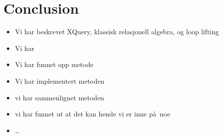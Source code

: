 \chapter{Conclusion}
\label{chapter:conclusion}
\begin{itemize}
  \item Vi har beskrevet XQuery, klassisk relasjonell algebra, og loop lifting
  \item Vi har 
  \item Vi har funnet opp metode
  \item Vi har implementert metoden
  \item vi har sammenlignet metoden
  \item vi har funnet ut at det kan hende vi er inne p\aa~noe
  \item \ldots
\end{itemize}